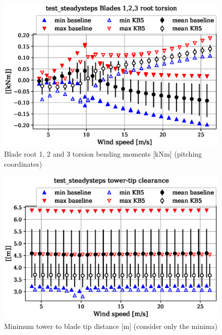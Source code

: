 \begin{figure}[!ht]
\begin{center}
	\includegraphics[width=.85\linewidth]{figures/baseline-vs-KB6/test_steadysteps/blade1-blade1-node-001-momentvec-z_AA0007_AA0003.eps}
\end{center}
\caption{Blade root 1, 2 and 3 torsion bending moments [kNm] (pitching coordinates)}
\label{fig:baseline-vs-KB6:test_steadysteps:blade-root-torsion}
\end{figure}

\begin{figure}[!ht]
\begin{center}
	\includegraphics[width=.85\linewidth]{figures/baseline-vs-KB6/test_steadysteps/DLL-towerclearance_mblade-inpvec-1_AA0007_AA0003.eps}
\end{center}
\caption{Minimum tower to blade tip distance [m] (consider only the minima)}
\label{fig:baseline-vs-KB6:test_steadysteps:tower-tip-clearance}
\end{figure}

